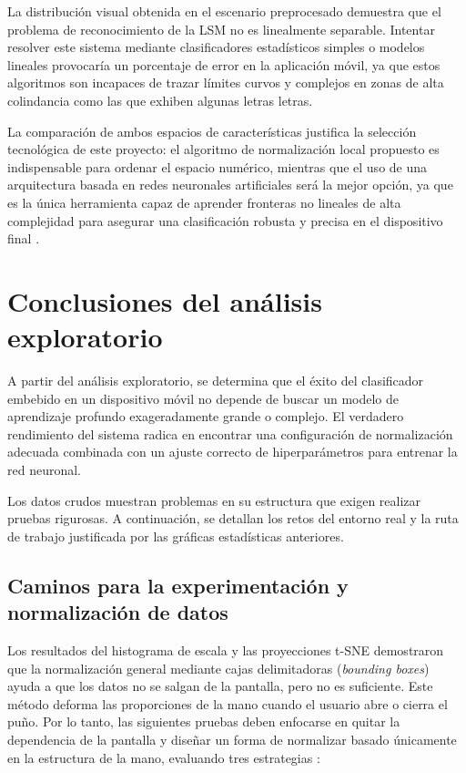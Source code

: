	La distribución visual obtenida en el escenario preprocesado demuestra  que el problema de reconocimiento de la LSM no es linealmente separable. Intentar resolver este sistema mediante clasificadores estadísticos simples o modelos lineales provocaría un porcentaje de error en la aplicación móvil, ya que estos algoritmos son incapaces de trazar límites curvos y complejos en zonas de alta colindancia como las que exhiben algunas letras  letras.
	
	La comparación de ambos espacios de características justifica la selección tecnológica de este proyecto: el algoritmo de normalización local propuesto es indispensable para ordenar el espacio numérico, mientras que el uso de una arquitectura basada en redes neuronales artificiales será la mejor opción, ya que es la única herramienta capaz de aprender fronteras no lineales de alta complejidad para asegurar una clasificación robusta y precisa en el dispositivo final \cite{geron2022hands}.
	
	\section{Conclusiones del análisis exploratorio}
	
	A partir del análisis exploratorio, se determina que el éxito del clasificador embebido en un dispositivo móvil no depende de buscar un modelo de aprendizaje profundo exageradamente grande o complejo. El verdadero rendimiento del sistema radica en encontrar una configuración de normalización adecuada combinada con un ajuste correcto de hiperparámetros para entrenar la red neuronal.
	
	Los datos crudos muestran problemas en su estructura que exigen realizar pruebas rigurosas. A continuación, se detallan los retos del entorno real y la ruta de trabajo justificada por las gráficas estadísticas anteriores.
	
	\subsection{Caminos para la experimentación y normalización de datos}
	
	Los resultados del histograma de escala y las proyecciones t-SNE demostraron que la normalización general mediante cajas delimitadoras (\textit{bounding boxes}) ayuda a que los datos no se salgan de la pantalla, pero no es suficiente. Este método deforma las proporciones de la mano cuando el usuario abre o cierra el puño. Por lo tanto, las siguientes pruebas deben enfocarse en quitar la dependencia de la pantalla y diseñar un forma de normalizar basado únicamente en la estructura de la mano, evaluando tres estrategias :
	
